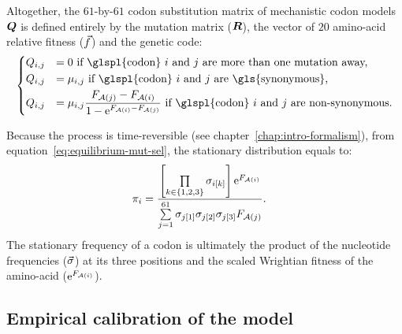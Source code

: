 Altogether, the $61$-by-$61$ \gls{codon} \gls{substitution} matrix of mechanistic \gls{codon} models $\bm{Q}$ is defined entirely by the mutation matrix ($\bm{R}$), the vector of $20$ amino-acid relative fitness ($\vec{f}$) and the genetic code:
\begin{equation}
    \begin{dcases}
        \submatrix_{\itoj} & = 0 \text{ if \glspl{codon} $\ci$ and $\cj$ are more than one mutation away,} \\
        \submatrix_{\itoj} & = \mu_{\itoj} \text{ if \glspl{codon} $\ci$ and $\cj$ are \gls{synonymous},} \\
        \submatrix_{\itoj} & = \mu_{\itoj} \dfrac{\Fitj - \Fiti}{1 - \e^{\Fiti - \Fitj} } \text{ if \glspl{codon} $\ci$ and $\cj$ are non-synonymous}.
    \end{dcases}
    \label{eq:propensities-models}
\end{equation}

Because the process is time-reversible (see chapter~\ref{chap:intro-formalism}), from equation~\ref{eq:equilibrium-mut-sel}, the stationary distribution equals to:
\begin{align}
    \pi_{{i}} & = \dfrac{\left[\prod\limits_{k \in \{ 1, 2, 3 \}} \sigma_{{i}[k]}\right]\text{e}^{F_{\mathcal{A}({i})}}}{\sum\limits_{{j}=1}^{61}\sigma_{{j}[1]}\sigma_{{j}[2]}\sigma_{{j}[3]}F_{\mathcal{A}({j})} }.
\end{align}
The stationary frequency of a \gls{codon} is ultimately the product of the nucleotide frequencies ($\vec{\sigma}$) at its three positions and the scaled Wrightian fitness of the amino-acid ($\text{e}^{F_{\mathcal{A}({i})}}$).

\subsection{Empirical calibration of the model}
\label{subsec:empirical-calibration-HB}

